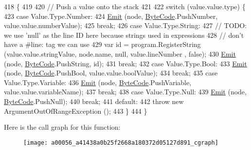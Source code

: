 \begin{DoxyCode}
418                                                              \{
419 
420             \textcolor{comment}{// Push a value onto the stack}
421 
422             \textcolor{keywordflow}{switch} (value.value.type) \{
423             \textcolor{keywordflow}{case} Value.Type.Number:
424                 \hyperlink{a00056_a774e8c143cdda0584fcfdda98626a83c}{Emit} (node, \hyperlink{a00053_ad5dfb6ee68ca7469623ad3e459f98894}{ByteCode}.PushNumber, value.value.numberValue);
425                 \textcolor{keywordflow}{break};
426             \textcolor{keywordflow}{case} Value.Type.String:
427                 \textcolor{comment}{// TODO: we use 'null' as the line ID here because strings used in expressions}
428                 \textcolor{comment}{// don't have a #line: tag we can use}
429                 var \textcolor{keywordtype}{id} = program.RegisterString (value.value.stringValue, node.name, null, value.lineNumber
      , \textcolor{keyword}{false});
430                 \hyperlink{a00056_a774e8c143cdda0584fcfdda98626a83c}{Emit} (node, \hyperlink{a00053_ad5dfb6ee68ca7469623ad3e459f98894}{ByteCode}.PushString, \textcolor{keywordtype}{id});
431                 \textcolor{keywordflow}{break};
432             \textcolor{keywordflow}{case} Value.Type.Bool:
433                 \hyperlink{a00056_a774e8c143cdda0584fcfdda98626a83c}{Emit} (node, \hyperlink{a00053_ad5dfb6ee68ca7469623ad3e459f98894}{ByteCode}.PushBool, value.value.boolValue);
434                 \textcolor{keywordflow}{break};
435             \textcolor{keywordflow}{case} Value.Type.Variable:
436                 \hyperlink{a00056_a774e8c143cdda0584fcfdda98626a83c}{Emit} (node, \hyperlink{a00053_ad5dfb6ee68ca7469623ad3e459f98894}{ByteCode}.PushVariable, value.value.variableName);
437                 \textcolor{keywordflow}{break};
438             \textcolor{keywordflow}{case} Value.Type.Null:
439                 \hyperlink{a00056_a774e8c143cdda0584fcfdda98626a83c}{Emit} (node, \hyperlink{a00053_ad5dfb6ee68ca7469623ad3e459f98894}{ByteCode}.PushNull);
440                 \textcolor{keywordflow}{break};
441             \textcolor{keywordflow}{default}:
442                 \textcolor{keywordflow}{throw} \textcolor{keyword}{new} ArgumentOutOfRangeException ();
443             \}
444         \}
\end{DoxyCode}


Here is the call graph for this function\-:
\nopagebreak
\begin{figure}[H]
\begin{center}
\leavevmode
\texttt{[image: a00056\_a41438a0b25f2668a180372d05127d891\_cgraph]}
\end{center}
\end{figure}


